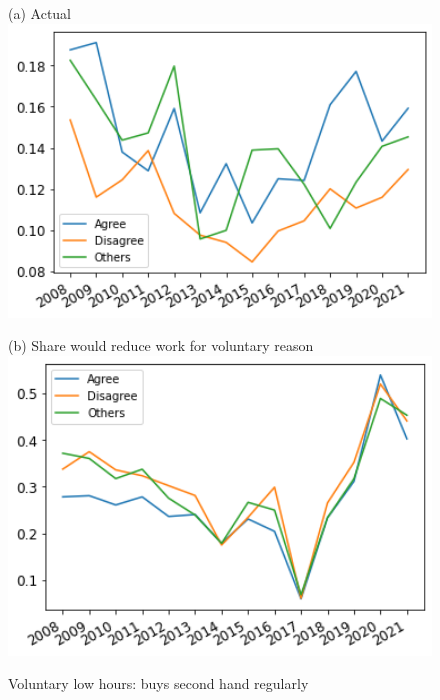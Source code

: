 \documentclass[12pt]{article}
\begin{document}
\begin{figure}[h!!]
	\centering	
	\caption{Voluntary low hours: buys second hand regularly }\label{fig:evolution_wtr_2ndhand}	
	\begin{minipage}[h!!]{0.32\textwidth}  
		\centering\footnotesize{(a) Actual}
		\includegraphics[width=1\textwidth]{../codding_data/results/liss/broad_groups_work_redcuctionqk20a135_actual.png}
	\end{minipage}
	\begin{minipage}[h!!]{0.32\textwidth}
		\centering\footnotesize{(b) Share would reduce work for voluntary reason}
		\includegraphics[width=1\textwidth]{../codding_data/results/liss/broad_groups_work_redcuctionqk20a135_willing.png}
	\end{minipage}
\end{figure}
\end{document}
